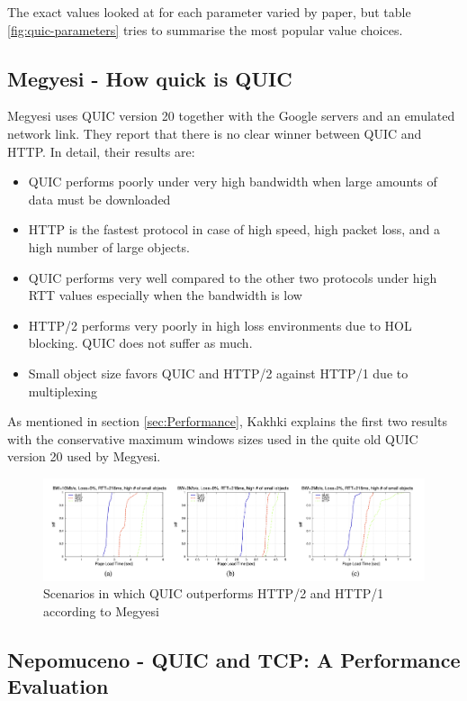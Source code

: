 \documentclass[conference]{IEEEtran}
\begin{document}
The exact values looked at for each parameter varied by paper, but table \ref{fig:quic-parameters} tries to summarise the most popular value choices.


\subsection{Megyesi - How quick is QUIC \cite{HowQuickIsQuic}}

Megyesi uses QUIC version 20 together with the Google servers and an emulated network link. They report that there is no clear winner between QUIC and HTTP. In detail, their results are:

\begin{itemize}
\item QUIC performs poorly under very high bandwidth when large amounts of data must be downloaded
\item HTTP is the fastest protocol in case of high speed, high packet loss, and a high number of large objects.
\item QUIC performs very well compared to the other two protocols under high RTT values especially when the bandwidth is low
\item HTTP/2 performs very poorly in high loss environments due to HOL blocking. QUIC does not suffer as much.
\item Small object size favors QUIC and HTTP/2 against HTTP/1 due to multiplexing
\end{itemize} 

As mentioned in section \ref{sec:Performance}, Kakhki explains the first two results with the conservative maximum windows sizes used in the quite old QUIC version 20 used by Megyesi.

\begin{figure}[htbp]
\centerline{\includegraphics[width=\textwidth]{images/Megyesi QUIC wins.png}}
\caption{Scenarios in which QUIC outperforms HTTP/2 and HTTP/1 according to Megyesi \cite{HowQuickIsQuic}}
\label{fig:megyesi-quic-wins}
\end{figure} 

\subsection{Nepomuceno - QUIC and TCP: A Performance Evaluation \cite{Nepomuceno}}
\end{document}

